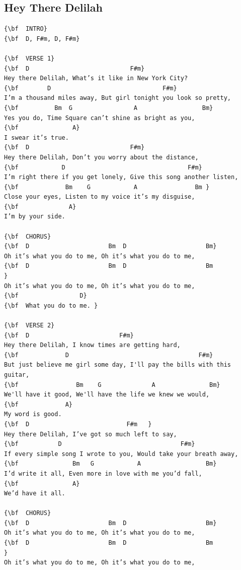 \documentclass[a4paper]{article}
\begin{document}
\subsection{Hey There Delilah}
\begin{Verbatim}[commandchars=\\\{\}]
{\bf  INTRO}
{\bf  D, F#m, D, F#m}

{\bf  VERSE 1}
{\bf  D                            F#m}
Hey there Delilah, What’s it like in New York City? 
{\bf        D                               F#m}
I’m a thousand miles away, But girl tonight you look so pretty, 
{\bf          Bm  G                 A                  Bm}
Yes you do, Time Square can’t shine as bright as you, 
{\bf               A}
I swear it’s true. 
{\bf  D                            F#m}
Hey there Delilah, Don’t you worry about the distance, 
{\bf            D                                  F#m}
I’m right there if you get lonely, Give this song another listen, 
{\bf             Bm    G            A                Bm }
Close your eyes, Listen to my voice it’s my disguise, 
{\bf              A}
I’m by your side. 

{\bf  CHORUS}
{\bf  D                      Bm  D                      Bm}
Oh it’s what you do to me, Oh it’s what you do to me, 
{\bf  D                      Bm  D                      Bm            }
Oh it’s what you do to me, Oh it’s what you do to me, 
{\bf                 D}
{\bf  What you do to me. }

{\bf  VERSE 2}
{\bf  D                         F#m}
Hey there Delilah, I know times are getting hard, 
{\bf             D                                    F#m}
But just believe me girl some day, I'll pay the bills with this guitar, 
{\bf                Bm    G              A               Bm}
We'll have it good, We'll have the life we knew we would, 
{\bf             A}
My word is good. 
{\bf  D                           F#m   }
Hey there Delilah, I’ve got so much left to say, 
{\bf           D                                 F#m}
If every simple song I wrote to you, Would take your breath away, 
{\bf               Bm   G            A                  Bm}
I’d write it all, Even more in love with me you’d fall, 
{\bf               A}
We’d have it all. 

{\bf  CHORUS}
{\bf  D                      Bm  D                      Bm}
Oh it’s what you do to me, Oh it’s what you do to me, 
{\bf  D                      Bm  D                      Bm            }
Oh it’s what you do to me, Oh it’s what you do to me, 


\end{Verbatim}
\end{document}
